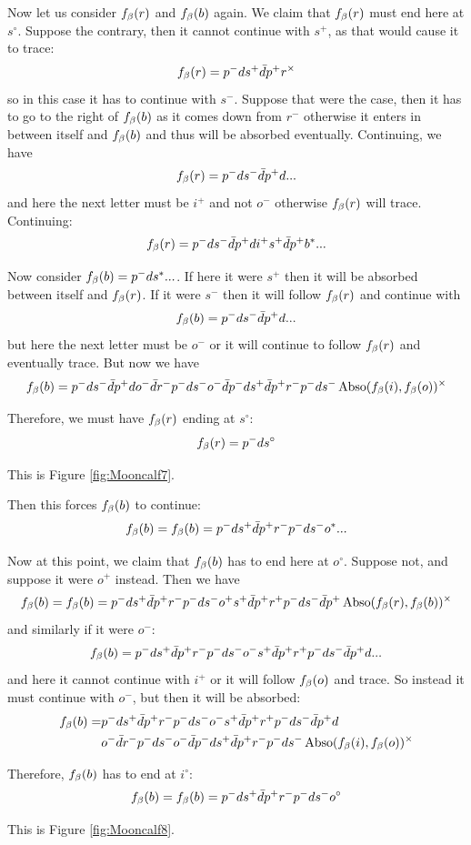 Now let us consider $f_\beta(r)$ and $f_\beta(b)$ again. We claim that $f_\beta(r)$ must end here at $s^\circ$. Suppose the contrary, then it cannot continue with $s^+$, as that would cause it to trace:
\[
f_\beta(r) = p^- d s^+ \bar{d} p^+ r^\times
\]
so in this case it has to continue with $s^-$. Suppose that were the case, then it has to go to the right of $f_\beta(b)$ as it comes down from $r^-$ otherwise it enters in between itself and $f_\beta(b)$ and thus will be absorbed eventually. Continuing, we have
\[
f_\beta(r) = p^- d s^- \bar{d} p^+ d...
\]
and here the next letter must be $i^+$ and not $o^-$ otherwise $f_\beta(r)$ will trace. Continuing:
\[
f_\beta(r) = p^- d s^- \bar{d} p^+ d i^+ s^+ \bar{d} p^+ b^*...
\]

Now consider $f_\beta(b) = p^- d s^*...$. If here it were $s^+$ then it will be absorbed between itself and $f_\beta(r)$. If it were $s^-$ then it will follow $f_\beta(r)$ and continue with
\[
f_\beta(b) = p^- d s^- \bar{d} p^+ d...
\]
but here the next letter must be $o^-$ or it will continue to follow $f_\beta(r)$ and eventually trace. But now we have
\[
f_\beta(b) = p^- d s^- \bar{d} p^+ d o^- \bar{d} r^- p^- d s^- o^- \bar{d} p^- d s^+ \bar{d} p^+ r^- p^- d s^- \operatorname{Abso}(f_\beta(i), f_\beta(o))^\times
\]

Therefore, we must have $f_\beta(r)$ ending at $s^\circ$:
\[
f_\beta(r) = p^- d s^\circ
\]

This is Figure \ref{fig:Mooncalf7}.

Then this forces $f_\beta(b)$ to continue:
\[
f_\beta(b) = f_\beta(b) = p^- d s^+ \bar{d} p^+ r^- p^- d s^- o^*...
\]

Now at this point, we claim that $f_\beta(b)$ has to end here at $o^\circ$. Suppose not, and suppose it were $o^+$ instead. Then we have
\[
f_\beta(b) = f_\beta(b) = p^- d s^+ \bar{d} p^+ r^- p^- d s^- o^+ s^+ \bar{d} p^+ r^+ p^- d s^- \bar{d} p^+ \operatorname{Abso}(f_\beta(r), f_\beta(b))^\times
\]
and similarly if it were $o^-$:
\[
f_\beta(b) = p^- d s^+ \bar{d} p^+ r^- p^- d s^- o^- s^+ \bar{d} p^+ r^+ p^- d s^- \bar{d} p^+ d...
\]
and here it cannot continue with $i^+$ or it will follow $f_\beta(o)$ and trace. So instead it must continue with $o^-$, but then it will be absorbed:
\begin{align*}
    f_\beta(b)  =& p^- d s^+ \bar{d} p^+ r^- p^- d s^- o^- s^+ \bar{d} p^+ r^+ p^- d s^- \bar{d} p^+ d\\
    & o^- \bar{d} r^- p^- d s^- o^- \bar{d} p^- d s^+ \bar{d} p^+ r^- p^- d s^- \operatorname{Abso}(f_\beta(i),  f_\beta(o))^\times 
\end{align*}

Therefore, $f_\beta(b)$ has to end at $i^\circ$:
\[
f_\beta(b) = f_\beta(b) = p^- d s^+ \bar{d} p^+ r^- p^- d s^- o^\circ
\]

This is Figure \ref{fig:Mooncalf8}.

